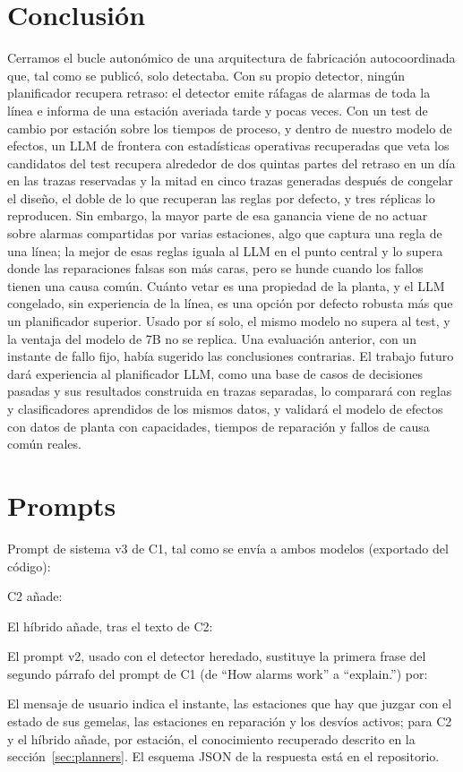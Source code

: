\documentclass[preprint,11pt]{elsarticle}
\begin{document}
\section{Conclusión}
\label{sec:conclusion}

Cerramos el bucle autonómico de una arquitectura de fabricación autocoordinada que, tal como se publicó, solo detectaba. Con su propio detector, ningún planificador recupera retraso: el detector emite ráfagas de alarmas de toda la línea e informa de una estación averiada tarde y pocas veces. Con un test de cambio por estación sobre los tiempos de proceso, y dentro de nuestro modelo de efectos, un LLM de frontera con estadísticas operativas recuperadas que veta los candidatos del test recupera alrededor de dos quintas partes del retraso en un día en las trazas reservadas y la mitad en cinco trazas generadas después de congelar el diseño, el doble de lo que recuperan las reglas por defecto, y tres réplicas lo reproducen. Sin embargo, la mayor parte de esa ganancia viene de no actuar sobre alarmas compartidas por varias estaciones, algo que captura una regla de una línea; la mejor de esas reglas iguala al LLM en el punto central y lo supera donde las reparaciones falsas son más caras, pero se hunde cuando los fallos tienen una causa común. Cuánto vetar es una propiedad de la planta, y el LLM congelado, sin experiencia de la línea, es una opción por defecto robusta más que un planificador superior. Usado por sí solo, el mismo modelo no supera al test, y la ventaja del modelo de 7B no se replica. Una evaluación anterior, con un instante de fallo fijo, había sugerido las conclusiones contrarias. El trabajo futuro dará experiencia al planificador LLM, como una base de casos de decisiones pasadas y sus resultados construida en trazas separadas, lo comparará con reglas y clasificadores aprendidos de los mismos datos, y validará el modelo de efectos con datos de planta con capacidades, tiempos de reparación y fallos de causa común reales.


\appendix
\section{Prompts}
\label{app:prompts}
Prompt de sistema v3 de C1, tal como se envía a ambos modelos (exportado del código):

C2 añade:

El híbrido añade, tras el texto de C2:

El prompt v2, usado con el detector heredado, sustituye la primera frase del segundo párrafo del prompt de C1 (de ``How alarms work'' a ``explain.'') por:

El mensaje de usuario indica el instante, las estaciones que hay que juzgar con el estado de sus gemelas, las estaciones en reparación y los desvíos activos; para C2 y el híbrido añade, por estación, el conocimiento recuperado descrito en la sección~\ref{sec:planners}. El esquema JSON de la respuesta está en el repositorio.
\end{document}
